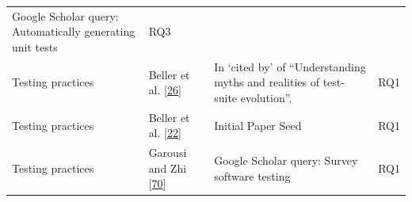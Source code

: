 \documentclass[]{book}
\begin{document}
\begin{longtable}[]{@{}llll@{}}
\begin{minipage}[t]{0.50\columnwidth}
Google Scholar query: Automatically generating unit tests\strut
\end{minipage} & \begin{minipage}[t]{0.04\columnwidth}\raggedright\strut
RQ3\strut
\end{minipage}\tabularnewline
\begin{minipage}[t]{0.18\columnwidth}\raggedright\strut
Testing practices\strut
\end{minipage} & \begin{minipage}[t]{0.16\columnwidth}\raggedright\strut
Beller et al. {[}\protect\hyperlink{ref-beller2015}{26}{]}\strut
\end{minipage} & \begin{minipage}[t]{0.50\columnwidth}\raggedright\strut
In `cited by' of ``Understanding myths and realities of test-suite
evolution''.\strut
\end{minipage} & \begin{minipage}[t]{0.04\columnwidth}\raggedright\strut
RQ1\strut
\end{minipage}\tabularnewline
\begin{minipage}[t]{0.18\columnwidth}\raggedright\strut
Testing practices\strut
\end{minipage} & \begin{minipage}[t]{0.16\columnwidth}\raggedright\strut
Beller et al.
{[}\protect\hyperlink{ref-beller2017developer}{22}{]}\strut
\end{minipage} & \begin{minipage}[t]{0.50\columnwidth}\raggedright\strut
Initial Paper Seed\strut
\end{minipage} & \begin{minipage}[t]{0.04\columnwidth}\raggedright\strut
RQ1\strut
\end{minipage}\tabularnewline
\begin{minipage}[t]{0.18\columnwidth}\raggedright\strut
Testing practices\strut
\end{minipage} & \begin{minipage}[t]{0.16\columnwidth}\raggedright\strut
Garousi and Zhi {[}\protect\hyperlink{ref-GAROUSI20131354}{70}{]}\strut
\end{minipage} & \begin{minipage}[t]{0.50\columnwidth}\raggedright\strut
Google Scholar query: Survey software testing\strut
\end{minipage} & \begin{minipage}[t]{0.04\columnwidth}\raggedright\strut
RQ1\strut
\end{minipage}\tabularnewline

\end{longtable}
\end{document}
